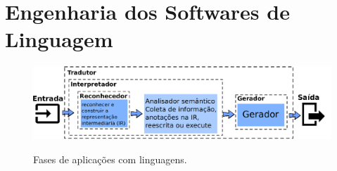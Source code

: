 
	\clearpage



\section{Engenharia dos Softwares de Linguagem}\label{sec:softEng}

\begin{figure}[h]
	\center
	\includegraphics[scale=0.9]{Imagens/stagesLanguageApp}
	\label{fig:stagesLanguageApp}
	\caption{Fases de aplicaç\~{o}es com linguagens.}
\end{figure}

